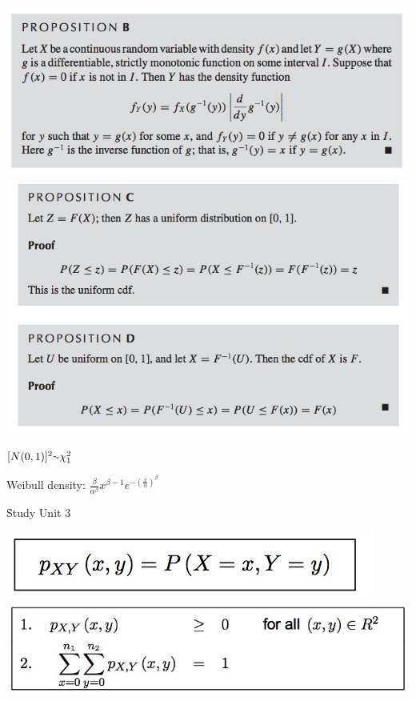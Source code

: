 \documentclass{examnotes}
\begin{document}
{\includegraphics[scale=0.6]{./img/2fun1.jpg}
\includegraphics[scale=0.6]{./img/2fun2.jpg}

$[N(0,1)]^2\mytilde \chi^2_1$

Weibull density: $\displaystyle\frac{\beta}{\alpha^\beta}x^{\beta-1}e^{-\left(\displaystyle\frac{x}{\alpha}\right)^\beta}$

\h{Study Unit 3}


\includegraphics[scale=0.4]{./img/3jd1.jpg}
\includegraphics[scale=0.4]{./img/3jd2.jpg}

}
\end{document}

